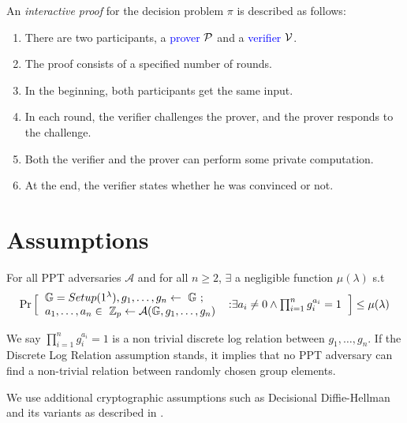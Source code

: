 An \emph{interactive proof} for the decision problem $\pi$ is described as follows:
\begin{enumerate}
    \item There are two participants, a \textcolor{blue}{prover} $\P$ and a \textcolor{blue}{verifier} $\V$.
    \item The proof consists of a specified number of rounds.
    \item In the beginning, both participants get the same input.
    \item In each round, the verifier challenges the prover, and the prover responds
    to the challenge.
    \item Both the verifier and the prover can perform some private computation.
    \item At the end, the verifier states whether he was convinced or not.
\end{enumerate}


\section{Assumptions}
\begin{defn}
    For all PPT adversaries $\mathcal{A}$ and for all $n\ge2$, $\exists$ a negligible function $\mu (\lambda)$ s.t
    \begin{equation*}
        \Pr 
        \Big[
        \begin{tabular}{ll}
             $\G = Setup(1^{\lambda}), g_1, \dots, g_n \leftarrow \ \G$ ;
             &
             \multirow{2}{*}{$\text{:} \exists a_i \neq 0 \wedge \prod_{i=1}^{n} g_{i}^{a_i} = 1$}\\
             $a_1, \dots, a_n \in \ \Z_p \leftarrow \mathcal{A}(\G, g_1, \dots, g_n)$
             & 
        \end{tabular}
        \Big] 
      \leq \mu(\lambda)
    \end{equation*}
   
    \vspace{0.2mm}
\end{defn} 
We say $\prod_{i=1}^{n} g_{i}^{a_i} = 1$ is a non trivial discrete log relation between $g_1, \dots, g_n$. If the Discrete Log Relation assumption stands, it implies that no \textsf{PPT} adversary can find a non-trivial relation between randomly chosen group elements. 

We use additional cryptographic assumptions such as Decisional Diffie-Hellman and its variants as described in \cite{Lai2019}.

